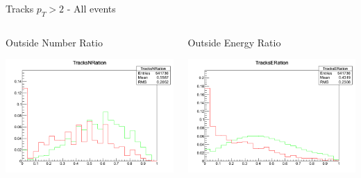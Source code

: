 \documentclass[8pt]{beamer}
\begin{document}
\begin{frame}{Tracks $p_T>2$ - All events}

\begin{columns}
 
\begin{block}{Outside Number Ratio}
 
\includegraphics[width=\linewidth]{img/Tracks2_TracksNRatio.png}

\end{block}

\begin{block}{Outside Energy Ratio}
 
\includegraphics[width=\linewidth]{img/Tracks2_TracksERatio.png}
 
\end{block}

\end{columns}

\end{frame}
\end{document}
